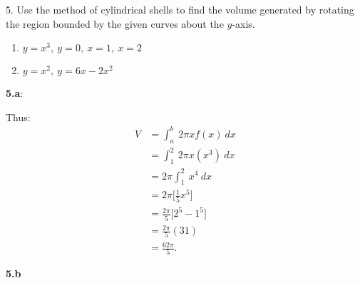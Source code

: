\documentclass{report}
\begin{document}
    \bigbreak \noindent \bigbreak \noindent 
    \begin{mdframed}
        5. Use the method of cylindrical shells to find the volume generated by rotating the region bounded by the given curves about the $y$-axis.
        \begin{enumerate}[label=(\alph*)]
            \item $y = x^{3},\ y=0,\ x=1,\ x=2 $ 
            \item $y= x^{2},\ y=6x-2x^{2} $
        \end{enumerate}
    \end{mdframed}
    \bigbreak \noindent 
    \textbf{5.a}:
    \bigbreak \noindent 
    \begin{minipage}[]{0.47\textwidth}
    \end{minipage}
    \begin{minipage}[]{0.47\textwidth}
        Thus:
        \begin{align*}
            V &= \int_{a}^{b}\ 2\pi xf(x)\ dx \\
              &=\int_{1}^{2}\ 2\pi x(x^{3})\ dx\\
              &=2\pi \int_{1}^{2}\ x^{4}\ dx \\
              &=2\pi \bigg[\frac{1}{5}x^{5}\bigg] \\
              &=\frac{2\pi}{5}\bigg[2^{5}-1^{5}\bigg] \\
              &=\frac{2\pi}{5}(31) \\
              &= \frac{62\pi}{5}
        .\end{align*}
    
    \end{minipage}
    \pagebreak \bigbreak \noindent 
    \textbf{5.b}
    \bigbreak \noindent 
    \begin{minipage}[]{0.47\textwidth}
    \end{minipage}
\end{document}
